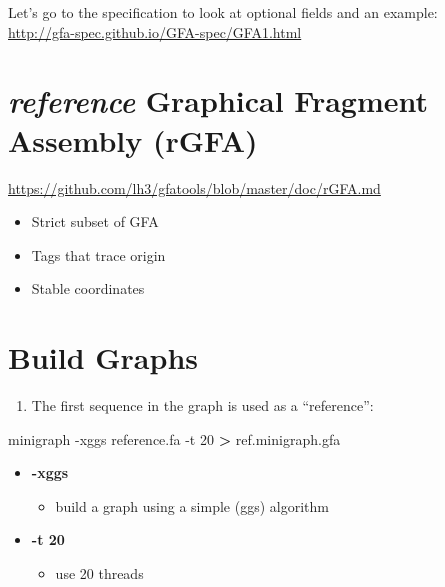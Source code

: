 \documentclass[
]{book}
\newenvironment{Shaded}{\begin{snugshade}}{\end{snugshade}}
\newcommand{\AttributeTok}[1]{\textcolor[rgb]{0.77,0.63,0.00}{#1}}
\newcommand{\ExtensionTok}[1]{#1}
\newcommand{\NormalTok}[1]{#1}
\newcommand{\OperatorTok}[1]{\textcolor[rgb]{0.81,0.36,0.00}{\textbf{#1}}}
\providecommand{\tightlist}{%
  \setlength{\itemsep}{0pt}\setlength{\parskip}{0pt}}
\begin{document}
Let's go to the specification to look at optional fields and an example:\\
\url{http://gfa-spec.github.io/GFA-spec/GFA1.html}

\hypertarget{reference-graphical-fragment-assembly-rgfa}{%
\section{\texorpdfstring{\emph{reference} Graphical Fragment Assembly (rGFA)}{reference Graphical Fragment Assembly (rGFA)}}\label{reference-graphical-fragment-assembly-rgfa}}

\url{https://github.com/lh3/gfatools/blob/master/doc/rGFA.md}

\begin{itemize}
\tightlist
\item
  Strict subset of GFA
\item
  Tags that trace origin
\item
  Stable coordinates
\end{itemize}

\hypertarget{build-graphs}{%
\section{Build Graphs}\label{build-graphs}}

\begin{enumerate}
\def\labelenumi{\arabic{enumi}.}
\tightlist
\item
  The first sequence in the graph is used as a ``reference'':
\end{enumerate}

\begin{Shaded}
\begin{Highlighting}[]
\ExtensionTok{minigraph} \AttributeTok{{-}xggs}\NormalTok{ reference.fa }\AttributeTok{{-}t}\NormalTok{ 20 }\OperatorTok{\textgreater{}}\NormalTok{ ref.minigraph.gfa}
\end{Highlighting}
\end{Shaded}

\begin{itemize}
\tightlist
\item
  \textbf{-xggs}

  \begin{itemize}
  \tightlist
  \item
    build a graph using a simple (ggs) algorithm
  \end{itemize}
\item
  \textbf{-t 20}

  \begin{itemize}
  \tightlist
  \item
    use 20 threads
  \end{itemize}
\end{itemize}
\end{document}

